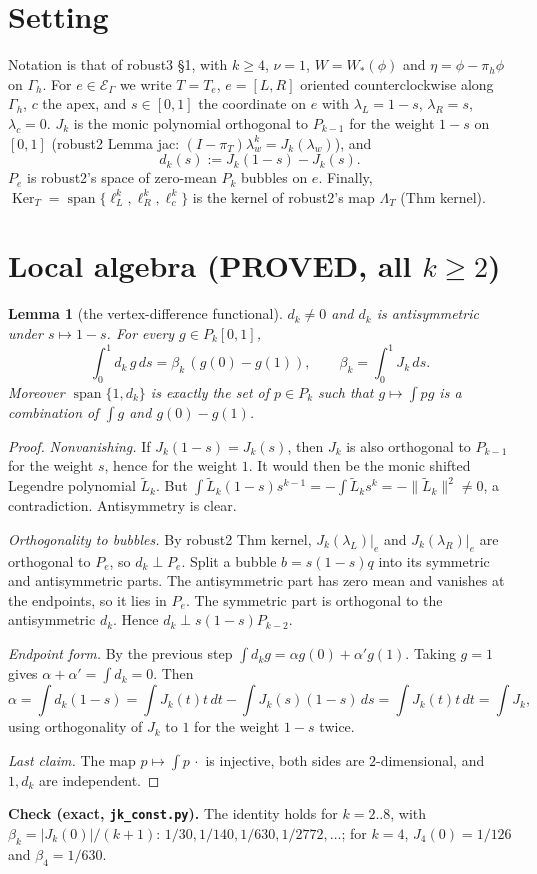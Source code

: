 \documentclass[11pt]{article}
\newtheorem{lemma}[theorem]{Lemma}
\theoremstyle{remark}
\newcommand{\Gh}{\Gamma_h}
\begin{document}
\section{Setting}
Notation is that of robust3 §1, with $k\ge4$, $\nu=1$, $W=W_\ast(\phi)$ and $\eta=\phi-\pi_h\phi$ on $\Gh$. For $e\in\mathcal
E_\Gamma$ we write $T=T_e$, $e=[L,R]$ oriented counterclockwise along $\Gh$, $c$ the apex, and $s\in[0,1]$ the
coordinate on $e$ with $\lambda_L=1-s$, $\lambda_R=s$, $\lambda_c=0$. $J_k$ is the monic polynomial orthogonal to $P_{k-1}$
for the weight $1-s$ on $[0,1]$ (robust2 Lemma jac: $(I-\pi_T)\lambda_w^k=J_k(\lambda_w)$), and
\[
d_k(s):=J_k(1-s)-J_k(s).
\]
$P_e$ is robust2's space of zero-mean $P_k$ bubbles on $e$. Finally,
$\operatorname{Ker}_T=\operatorname{span}\{\ell_L^k,\ell_R^k,\ell_c^k\}$ is the kernel of robust2's map
$\Lambda_T$ (Thm kernel).

\section{Local algebra (PROVED, all $k\ge2$)}
\begin{lemma}[the vertex-difference functional]\label{lem:dk}
$d_k\ne0$ and $d_k$ is antisymmetric under $s\mapsto1-s$. For every $g\in P_k[0,1]$,
\[
\int_0^1d_k\,g\,ds=\beta_k\,(g(0)-g(1)),\qquad \beta_k=\int_0^1J_k\,ds .
\]
Moreover $\operatorname{span}\{1,d_k\}$ is exactly the set of $p\in P_k$ such that $g\mapsto\int pg$ is a combination of $\int g$
and $g(0)-g(1)$.
\end{lemma}
\begin{proof}
\emph{Nonvanishing.} If $J_k(1-s)=J_k(s)$, then $J_k$ is also orthogonal to $P_{k-1}$ for the weight $s$, hence for the
weight $1$. It would then be the monic shifted Legendre polynomial $\tilde L_k$. But
$\int\tilde L_k(1-s)s^{k-1}=-\int\tilde L_ks^k=-\|\tilde L_k\|^2\ne0$, a contradiction. Antisymmetry is clear.

\emph{Orthogonality to bubbles.} By robust2 Thm kernel, $J_k(\lambda_L)|_e$ and $J_k(\lambda_R)|_e$ are orthogonal to $P_e$,
so $d_k\perp P_e$. Split a bubble $b=s(1-s)q$ into its symmetric and antisymmetric parts. The antisymmetric part has zero
mean and vanishes at the endpoints, so it lies in $P_e$. The symmetric part is orthogonal to the antisymmetric $d_k$. Hence
$d_k\perp s(1-s)P_{k-2}$.

\emph{Endpoint form.} By the previous step $\int d_kg=\alpha g(0)+\alpha'g(1)$. Taking $g=1$ gives $\alpha+\alpha'=\int d_k=0$.
Then
\[
\alpha=\int d_k(1-s)=\int J_k(t)t\,dt-\int J_k(s)(1-s)\,ds=\int J_k(t)t\,dt=\int J_k ,
\]
using orthogonality of $J_k$ to $1$ for the weight $1-s$ twice.

\emph{Last claim.} The map $p\mapsto\int p\,\cdot$ is injective, both sides are $2$-dimensional, and $1,d_k$ are independent.
\end{proof}
\noindent\textbf{Check (exact, \texttt{jk\_const.py}).} The identity holds for $k=2..8$, with
$\beta_k=|J_k(0)|/(k+1)$: $1/30,1/140,1/630,1/2772,\dots$; for $k=4$, $J_4(0)=1/126$ and $\beta_4=1/630$.
\end{document}
